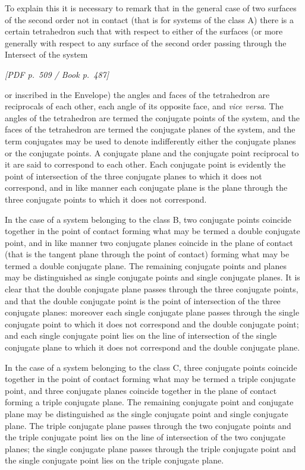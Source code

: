 \documentclass[11pt]{article}
\newcommand{\Page}[2]{\bigskip\noindent\textit{[PDF p.~#1 / Book p.~#2]}\par\smallskip}
\begin{document}
To explain this it is necessary to remark that in the general case of two surfaces of
the second order not in contact (that is for systems of the class A) there is a certain
tetrahedron such that with respect to either of the surfaces (or more generally with
respect to any surface of the second order passing through the Intersect of the system

\Page{509}{487}

\noindent or inscribed in the Envelope) the angles and faces of the tetrahedron are reciprocals
of each other, each angle of its opposite face, and \textit{vice versa}. The angles of the
tetrahedron are termed the conjugate points of the system, and the faces of the
tetrahedron are termed the conjugate planes of the system, and the term conjugates
may be used to denote indifferently either the conjugate planes or the conjugate
points. A conjugate plane and the conjugate point reciprocal to it are said to
correspond to each other. Each conjugate point is evidently the point of intersection
of the three conjugate planes to which it does not correspond, and in like manner each
conjugate plane is the plane through the three conjugate points to which it does not
correspond.

In the case of a system belonging to the class B, two conjugate points coincide
together in the point of contact forming what may be termed a double conjugate point,
and in like manner two conjugate planes coincide in the plane of contact (that is the
tangent plane through the point of contact) forming what may be termed a double
conjugate plane. The remaining conjugate points and planes may be distinguished as
single conjugate points and single conjugate planes. It is clear that the double
conjugate plane passes through the three conjugate points, and that the double
conjugate point is the point of intersection of the three conjugate planes: moreover
each single conjugate plane passes through the single conjugate point to which it does
not correspond and the double conjugate point; and each single conjugate point lies on
the line of intersection of the single conjugate plane to which it does not correspond
and the double conjugate plane.

In the case of a system belonging to the class C, three conjugate points coincide
together in the point of contact forming what may be termed a triple conjugate point,
and three conjugate planes coincide together in the plane of contact forming a triple
conjugate plane. The remaining conjugate point and conjugate plane may be
distinguished as the single conjugate point and single conjugate plane. The triple
conjugate plane passes through the two conjugate points and the triple conjugate point
lies on the line of intersection of the two conjugate planes; the single conjugate plane
passes through the triple conjugate point and the single conjugate point lies on the
triple conjugate plane.
\end{document}
